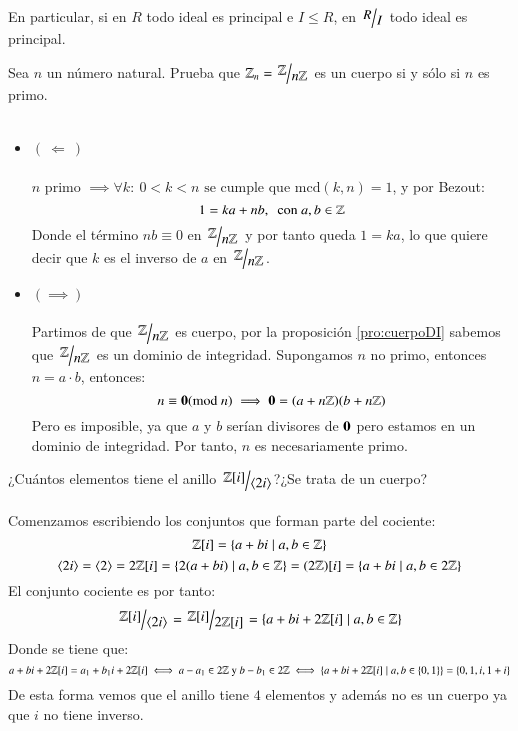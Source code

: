 \begin{obs}
    En particular, si en $R$ todo ideal es principal e $I \leq R$, en $\quo{R}{I}$ todo ideal es principal.
\end{obs}

\begin{ex}[H1.5]
    Sea $n$ un número natural. Prueba que $\Z_n = \ZnZ$ es un cuerpo si y sólo si $n$ es primo.\\\\
    \begin{itemize}
        \item $\left(\ \Longleftarrow\ \right)$\\\\
        $ n $ primo $ \implies \forall k:\ 0 < k < n \text{ se cumple que } \mathrm{mcd}(k, n) = 1$, y por Bezout:
        $$
            1 = ka + nb,\ \text{ con } a, b \in \mathbb{Z}
        $$
        Donde el término $nb \equiv 0$ en $\ZnZ$ y por tanto queda $1 = ka$, lo que quiere decir que $k$ es el inverso de $a$ en $\ZnZ$.
        \item $\left(\implies\right)$\\\\
        Partimos de que $\ZnZ$ es cuerpo, por la proposición \ref{pro:cuerpoDI} sabemos que $\ZnZ$ es un dominio de integridad. Supongamos $n$ no primo, entonces $n = a\cdot b$, entonces:
        $$
            n \equiv \mathbf{0} (\mathrm{mod}\ n) \implies \mathbf{0} = (a + n\mathbb{Z})(b + n\mathbb{Z})
        $$
        Pero es imposible, ya que $a$ y $b$ serían divisores de $\mathbf{0}$ pero estamos en un dominio de integridad. Por tanto, $n$ es necesariamente primo.
    \end{itemize}
\end{ex}

\begin{ex}[H1.12]
    ¿Cuántos elementos tiene el anillo $\quo{\Z[i]}{\gen{2i}}$?¿Se trata de un cuerpo?\\\\
    Comenzamos escribiendo los conjuntos que forman parte del cociente:
    $$
        \mathbb{Z}[i] = \left\{a + bi \mid a, b \in \mathbb{Z}\right\}
    $$
    $$
        \langle2i\rangle = \langle2\rangle = 2\mathbb{Z}[i] = \left\{2(a+bi) \mid a,b \in \mathbb{Z}\right\} = (2\mathbb{Z})[i] = \left\{a + bi \mid a, b \in 2\mathbb{Z}\right\}
    $$
    El conjunto cociente es por tanto:
    $$
        \quo{\Z[i]}{\gen{2i}} = \quo{\Z[i]}{2\Z[i]} = \left\{ a+bi + 2\Z[i] \mid a, b \in \Z \right\}
    $$
    Donde se tiene que:
    $$
        a + bi + 2\mathbb{Z}[i] = a_1 + b_1i + 2\mathbb{Z}[i] \iff a-a_1 \in 2\mathbb{Z} \text{ y } b-b_1 \in 2\mathbb{Z} \iff \left\{a+bi+2\mathbb{Z}[i] \mid a, b \in \left\{0, 1\right\}\right\} = \left\{0, 1, i, 1+i\right\}
    $$
    De esta forma vemos que el anillo tiene $4$ elementos y además no es un cuerpo ya que $i$ no tiene inverso.
\end{ex}

